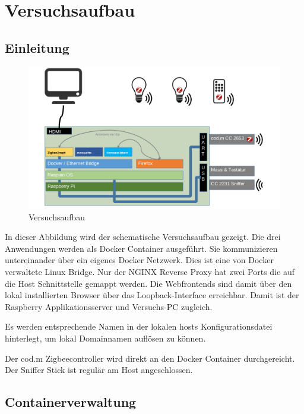 \chapter{Versuchsaufbau}
\section{Einleitung}

\begin{figure}[H]
    \centering
    \includegraphics[width=1\textwidth]{media/Versuchsaufbau/image1.png}
    \caption{Versuchsaufbau}
  \end{figure}

In dieser Abbildung wird der schematische Versuchsaufbau gezeigt. Die drei Anwendungen werden als Docker Container ausgeführt. Sie kommunizieren
untereinander über ein eigenes Docker Netzwerk. Dies ist eine von Docker verwaltete Linux Bridge. Nur der NGINX Reverse Proxy hat zwei Ports die
auf die Host Schnittstelle gemappt werden. Die Webfrontends sind damit über den lokal installierten Browser über das Loopback-Interface erreichbar. 
Damit ist der Raspberry Applikationsserver und Versuchs-PC zugleich.

Es werden entsprechende Namen in der lokalen \grqq hosts\grqq{} Konfigurationsdatei hinterlegt, um lokal Domainnamen auflösen zu können.

Der cod.m Zigbeecontroller wird direkt an den Docker Container durchgereicht. Der Sniffer Stick ist regulär am Host angeschlossen. 

\section{Containerverwaltung}



